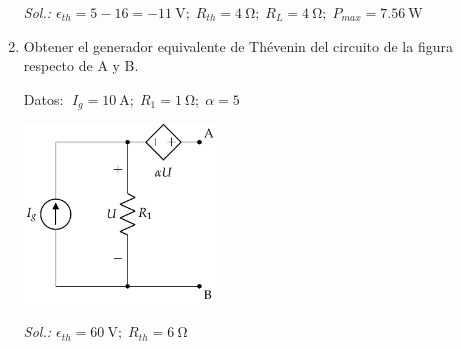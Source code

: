 \begin{enumerate}
    \emph{Sol.:\;
      $\epsilon_{th}=5-16=\qty{-11}{\volt};\; R_{th}=\qty{4}{\ohm};\;
      R_L=\qty{4}{\ohm};\;P_{max}=\qty{7.56}{\watt}$}


  \item Obtener el generador equivalente de Thévenin del circuito de la figura respecto de A y B.
  
    Datos: $\; I_g=\qty{10}{\ampere};\; R_1=\qty{1}{\ohm};\; \alpha=5$
    \begin{center}
      \includegraphics[height=4.75cm]{../figs/Thevenin1.pdf}
    \end{center}

    \emph{Sol.:\; $\epsilon_{th}=\qty{60}{\volt};\; R_{th}=\qty{6}{\ohm}$}



      

      


\end{enumerate}
